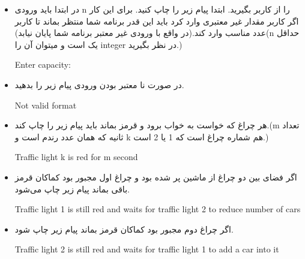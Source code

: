 \documentclass[]{article}
\begin{document}
\begin{itemize}
\item
در ابتدا باید ورودی n را از کاربر بگیرید. ابتدا پیام زیر را چاپ کنید. برای 
این کار اگر کاربر مقدار غیر معتبری وارد کرد باید این قدر برنامه شما منتظر 
بماند تا کاربر عدد مناسب وارد کند.(در واقع با ورودی غیر معتبر برنامه شما 
پایان نیابد)(n حداقل یک است و میتوان آن را integer در نظر بگیرید.)
\begin{tcolorbox}[boxrule=0pt]
	\begin{latin}
		\large{
			Enter capacity:
		}
	\end{latin}
\end{tcolorbox}

\item
در صورت نا معتبر بودن ورودی پیام زیر را بدهید.
\begin{tcolorbox}[boxrule=0pt]
	\begin{latin}
		\large{
			Not valid format
		}
	\end{latin}
\end{tcolorbox}

\item
هر چراغ که خواست به خواب برود و قرمز بماند باید پیام زیر را چاپ کند.(m 
تعداد ثانیه که همان عدد رندم است و k هم شماره چراغ است که 1 یا 2 است.)
\begin{tcolorbox}[boxrule=0pt]
	\begin{latin}
		\large{
			Traffic light k is red for m second
		}
	\end{latin}
\end{tcolorbox}

\item
اگر فضای بین دو چراغ از ماشین پر شده بود و چراغ اول مجبور بود کماکان قرمز 
باقی بماند پیام زیر چاپ می‌شود.
\begin{tcolorbox}[boxrule=0pt]
	\begin{latin}
		\large{
			Traffic light 1 is still red and waits for traffic light 2 to 
			reduce number of cars
		}
	\end{latin}
\end{tcolorbox}

\item
اگر چراغ دوم مجبور بود کماکان قرمز بماند پیام زیر چاپ شود.
\begin{tcolorbox}[boxrule=0pt]
	\begin{latin}
		\large{
			Traffic light 2 is still red and waits for traffic light 1 to add a 
			car into it
		}
	\end{latin}
\end{tcolorbox}


\end{itemize}
\end{document}
